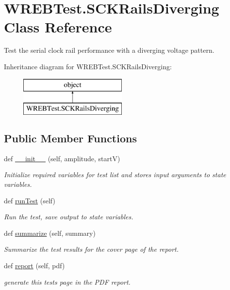\hypertarget{class_w_r_e_b_test_1_1_s_c_k_rails_diverging}{}\section{W\+R\+E\+B\+Test.\+S\+C\+K\+Rails\+Diverging Class Reference}
\label{class_w_r_e_b_test_1_1_s_c_k_rails_diverging}


Test the serial clock rail performance with a diverging voltage pattern.  


Inheritance diagram for W\+R\+E\+B\+Test.\+S\+C\+K\+Rails\+Diverging\+:\begin{figure}[H]
\begin{center}
\leavevmode
\includegraphics[height=2.000000cm]{class_w_r_e_b_test_1_1_s_c_k_rails_diverging}
\end{center}
\end{figure}
\subsection*{Public Member Functions}
\begin{DoxyCompactItemize}
\item 
def \hyperlink{class_w_r_e_b_test_1_1_s_c_k_rails_diverging_ab39e5d3330990a4f7bcd6ba455458c51}{\+\_\+\+\_\+init\+\_\+\+\_\+} (self, amplitude, startV)
\begin{DoxyCompactList}\small\item\em Initialize required variables for test list and stores input arguments to state variables. \end{DoxyCompactList}\item 
def \hyperlink{class_w_r_e_b_test_1_1_s_c_k_rails_diverging_a549807de798a22afefb13b25bdaf9dd1}{run\+Test} (self)
\begin{DoxyCompactList}\small\item\em Run the test, save output to state variables. \end{DoxyCompactList}\item 
def \hyperlink{class_w_r_e_b_test_1_1_s_c_k_rails_diverging_ad07c939b9865cd306161310c864ada90}{summarize} (self, summary)
\begin{DoxyCompactList}\small\item\em Summarize the test results for the cover page of the report. \end{DoxyCompactList}\item 
def \hyperlink{class_w_r_e_b_test_1_1_s_c_k_rails_diverging_aba2dbb1030e9d1a774640fac9b1c2b26}{report} (self, pdf)
\begin{DoxyCompactList}\small\item\em generate this test\textquotesingle{}s page in the P\+DF report. \end{DoxyCompactList}\end{DoxyCompactItemize}


